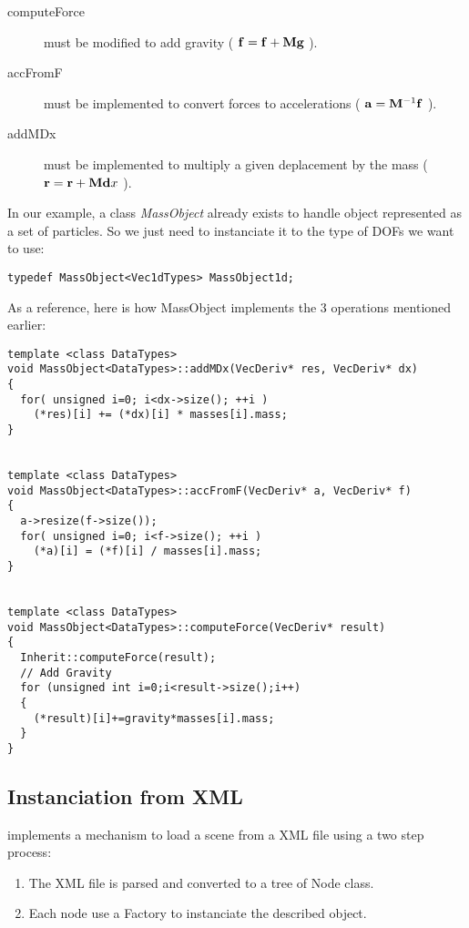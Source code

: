 \begin{description}
\item[computeForce] must be modified to add gravity ( $\mathbf f = \mathbf f + \mathbf M \mathbf g$ ).
\item[accFromF] must be implemented to convert forces to accelerations ( $\mathbf a = \mathbf M^{-1} \mathbf f$ ).
\item[addMDx] must be implemented to multiply a given deplacement by the mass ( $ \mathbf r = \mathbf r + \mathbf M \mathbf dx$ ).
\end{description}

In our example, a class \textit{MassObject} already exists to handle object represented as a set of particles. So we just need to instanciate it to the type of DOFs we want to use:

\begin{verbatim}
typedef MassObject<Vec1dTypes> MassObject1d;
\end{verbatim}

As a reference, here is how MassObject implements the 3 operations mentioned earlier:

\begin{verbatim}
template <class DataTypes>
void MassObject<DataTypes>::addMDx(VecDeriv* res, VecDeriv* dx)
{
  for( unsigned i=0; i<dx->size(); ++i )
    (*res)[i] += (*dx)[i] * masses[i].mass;
}


template <class DataTypes>
void MassObject<DataTypes>::accFromF(VecDeriv* a, VecDeriv* f)
{
  a->resize(f->size());
  for( unsigned i=0; i<f->size(); ++i )
    (*a)[i] = (*f)[i] / masses[i].mass;
}


template <class DataTypes>
void MassObject<DataTypes>::computeForce(VecDeriv* result)
{
  Inherit::computeForce(result);
  // Add Gravity
  for (unsigned int i=0;i<result->size();i++)
  {
    (*result)[i]+=gravity*masses[i].mass;
  }
}
\end{verbatim}

\subsection{Instanciation from XML}

\sofa{} implements a mechanism to load a scene from a XML file using a two step process:

\begin{enumerate}
\item The XML file is parsed and converted to a tree of Node class.
\item Each node use a Factory to instanciate the described object.
\end{enumerate}

